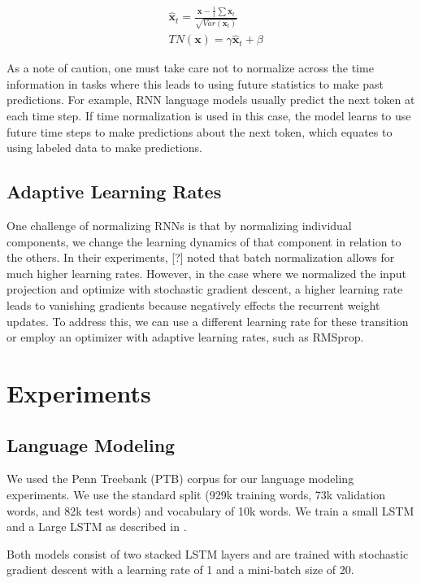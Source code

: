 \documentclass{article}
\def\x{{\mathbf x}}
\begin{document}
\begin{equation}
	\begin{split}
		& \hat \x_t = \frac{\boldsymbol x - \frac{1}{t} \sum \x_t}{\sqrt{Var(\x_t)}} \\
		& TN(\x) = \gamma \hat \x_t + \beta
	\end{split}
\end{equation}

As a note of caution, one must take care not to normalize across the time information in tasks where this leads to using future statistics to make past predictions. For example, RNN language models usually predict the next token at each time step. If time normalization is used in this case, the model learns to use future time steps to make predictions about the next token, which equates to using labeled data to make predictions.

\subsection{Adaptive Learning Rates} One challenge of normalizing RNNs is that by normalizing individual components, we change the learning dynamics of that component in relation to the others. In their experiments, [?] noted that batch normalization allows for much higher learning rates. However, in the case where we normalized the input projection and optimize with stochastic gradient descent, a higher learning rate leads to vanishing gradients because negatively effects the recurrent weight updates. To address this, we can use a different learning rate for these transition or employ an optimizer with adaptive learning rates, such as RMSprop.


\section{Experiments}

\subsection{Language Modeling}
We used the Penn Treebank (PTB) \citep{marcus1993building} corpus for our language modeling experiments. We use the standard split (929k training words, 73k validation words, and 82k test words) and vocabulary of 10k words. We train a small LSTM and a Large LSTM as described in \citep{zaremba2014recurrent}.

Both models consist of two stacked LSTM layers and are trained with stochastic gradient descent with a learning rate of 1 and a mini-batch size of 20.
\end{document}
